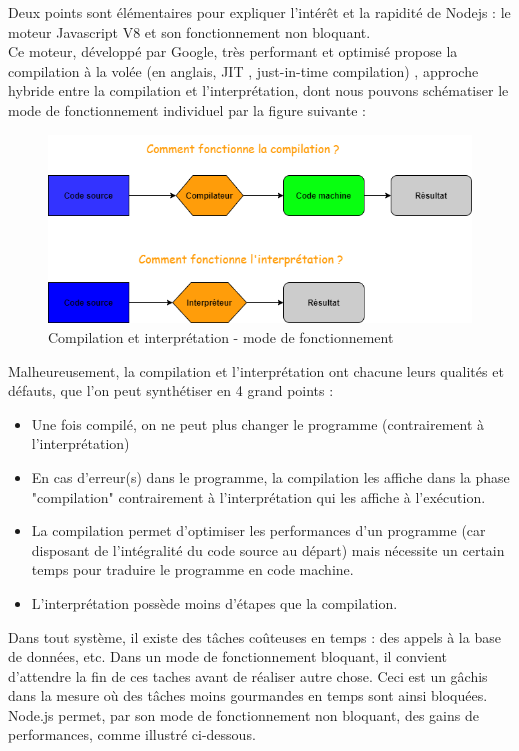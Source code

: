 Deux points sont élémentaires pour expliquer l'intérêt et la rapidité de Nodejs : le moteur Javascript V8 et son fonctionnement non bloquant. \\

Ce moteur, développé par Google, très performant et optimisé propose la compilation à la volée (en anglais, JIT , just-in-time compilation) , approche hybride entre la compilation et l'interprétation, dont nous pouvons schématiser le mode de fonctionnement individuel par la figure suivante :
\begin{figure}[H]
    \includegraphics[width=\textwidth,height=\textheight,keepaspectratio]{images/compilationVSinterpretation.png}
    \centering
    \caption{Compilation et interprétation - mode de fonctionnement}
\end{figure}

Malheureusement, la compilation et l'interprétation ont chacune leurs qualités et défauts, que l'on peut synthétiser en 4 grand points :
\begin{itemize}
    \item Une fois compilé, on ne peut plus changer le programme (contrairement à l'interprétation)
    \item En cas d'erreur(s) dans le programme, la compilation les affiche dans la phase "compilation" contrairement à l'interprétation qui les affiche à l'exécution. 
    \item La compilation permet d'optimiser les performances d'un programme (car disposant de l'intégralité du code source au départ) mais nécessite un certain temps pour traduire le programme en code machine.
    \item L'interprétation possède moins d'étapes que la compilation.
\end{itemize}

Dans tout système, il existe des tâches coûteuses en temps : des appels à la base de données, etc.
Dans un mode de fonctionnement bloquant, il convient d'attendre la fin de ces taches avant de réaliser autre chose. Ceci est un gâchis dans la mesure où des tâches moins gourmandes en temps sont ainsi bloquées. Node.js permet, par son mode de fonctionnement non bloquant, des gains de performances, comme illustré ci-dessous.

